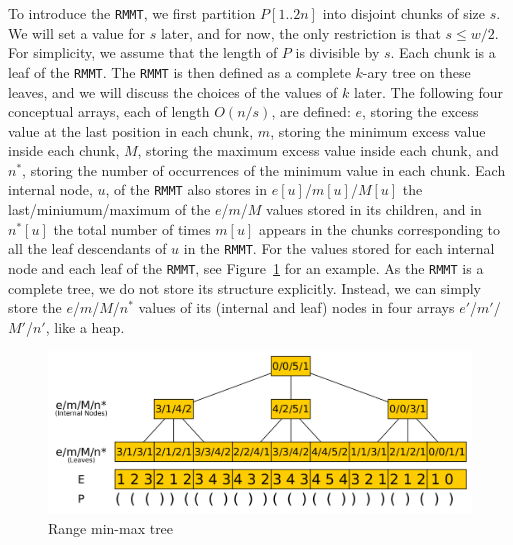 To introduce the {\tt RMMT}, we first partition $P[1..2n]$ into disjoint chunks of size $s$. We will set a value for $s$ later, and for now, the only restriction is that $s \le w/2$. 
For simplicity, we assume that the length of $P$ is divisible by $s$. 
Each chunk is a leaf of the {\tt RMMT}. The {\tt RMMT} is then defined as a complete $k$-ary tree on these leaves, and we will discuss the choices of the values of $k$ later. %
The following four conceptual arrays, each of length $O(n/s)$, are defined: $e$, storing the excess value at the last position in each chunk, $m$, storing the minimum excess value inside
each chunk, $M$, storing the maximum excess value inside each
chunk, and $n^*$, storing the number of occurrences of the minimum
value in each chunk. 
Each internal node, $u$, of the {\tt RMMT} also stores in $e[u]$/$m[u]$/$M[u]$ the last/miniumum/maximum of the $e$/$m$/$M$ values stored in its children, and in $n^*[u]$ the total number of times $m[u]$ appears in the chunks corresponding to all the leaf descendants of $u$ in the {\tt RMMT}. 
For the values stored for each internal node and each leaf of the {\tt RMMT}, see Figure~\ref{fig:RangeMinMaxTree} for an example. 
As the {\tt RMMT} is a complete tree, we do not store its structure explicitly. 
Instead, we can simply store the $e$/$m$/$M$/$n^*$ values of its (internal and leaf) nodes in four arrays $e'$/$m'$/$M'$/$n'$, like a heap. 

\begin{figure}[ht]
  \centering
  \includegraphics[scale=0.18]{./images/Range-min-max-tree.png}
  \caption{Range min-max tree}
  \label{fig:RangeMinMaxTree} 
\end{figure}

